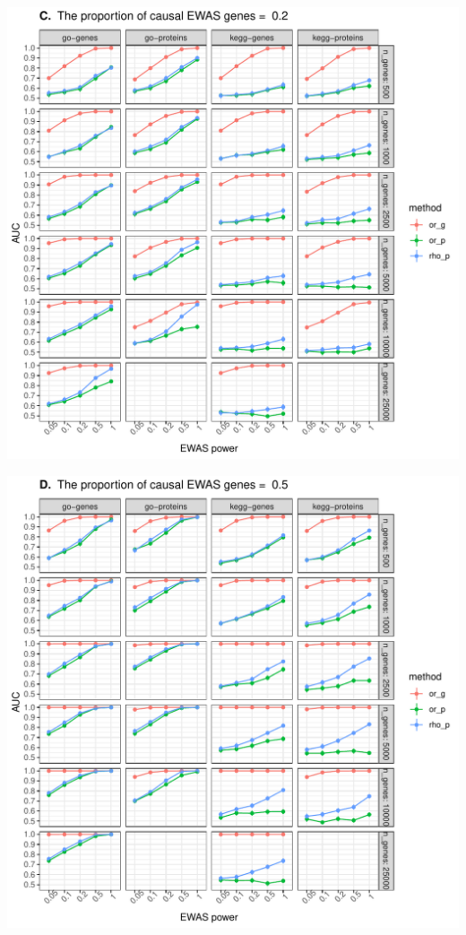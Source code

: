 \documentclass[11pt,twoside]{bristolthesis}
\begin{document}
\begin{center}\includegraphics[width=1\linewidth]{figure/06-ewas_gwas_comparison/method_test_gene_v_protein/PEC_0.2} \end{center}
\begin{center}\includegraphics[width=1\linewidth]{figure/06-ewas_gwas_comparison/method_test_gene_v_protein/PEC_0.5} \end{center}
\end{document}
